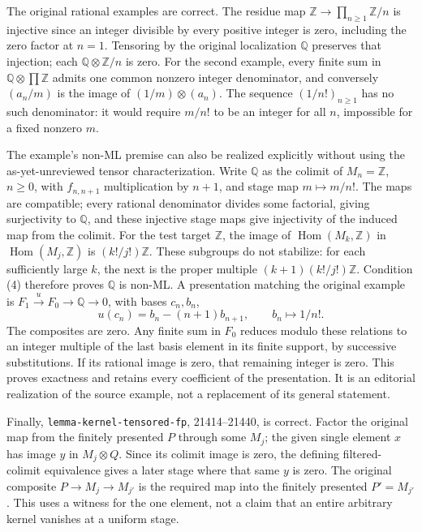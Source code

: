 The original rational examples are correct. The residue map \(\mathbb Z\to\prod_{n\geq1}\mathbb Z/n\) is injective since an integer divisible by every positive integer is zero, including the zero factor at \(n=1\). Tensoring by the original localization \(\mathbb Q\) preserves that injection; each \(\mathbb Q\otimes\mathbb Z/n\) is zero. For the second example, every finite sum in \(\mathbb Q\otimes\prod\mathbb Z\) admits one common nonzero integer denominator, and conversely \((a_n/m)\) is the image of \((1/m)\otimes(a_n)\). The sequence \((1/n!)_{n\geq1}\) has no such denominator: it would require \(m/n!\) to be an integer for all \(n\), impossible for a fixed nonzero \(m\).

The example's non-ML premise can also be realized explicitly without using the as-yet-unreviewed tensor characterization. Write \(\mathbb Q\) as the colimit of \(M_n=\mathbb Z\), \(n\geq0\), with \(f_{n,n+1}\) multiplication by \(n+1\), and stage map \(m\mapsto m/n!\). The maps are compatible; every rational denominator divides some factorial, giving surjectivity to \(\mathbb Q\), and these injective stage maps give injectivity of the induced map from the colimit. For the test target \(\mathbb Z\), the image of \(\operatorname{Hom}(M_k,\mathbb Z)\) in \(\operatorname{Hom}(M_j,\mathbb Z)\) is \((k!/j!)\mathbb Z\). These subgroups do not stabilize: for each sufficiently large \(k\), the next is the proper multiple \((k+1)(k!/j!)\mathbb Z\). Condition (4) therefore proves \(\mathbb Q\) is non-ML. A presentation matching the original example is \(F_1\xrightarrow{u}F_0\to\mathbb Q\to0\), with bases \(c_n,b_n\), \[
u(c_n)=b_n-(n+1)b_{n+1},\qquad b_n\longmapsto1/n!.
\] The composites are zero. Any finite sum in \(F_0\) reduces modulo these relations to an integer multiple of the last basis element in its finite support, by successive substitutions. If its rational image is zero, that remaining integer is zero. This proves exactness and retains every coefficient of the presentation. It is an editorial realization of the source example, not a replacement of its general statement.

Finally, \texttt{lemma-kernel-tensored-fp}, 21414--21440, is correct. Factor the original map from the finitely presented \(P\) through some \(M_j\); the given single element \(x\) has image \(y\) in \(M_j\otimes Q\). Since its colimit image is zero, the defining filtered-colimit equivalence gives a later stage where that same \(y\) is zero. The original composite \(P\to M_j\to M_{j'}\) is the required map into the finitely presented \(P'=M_{j'}\). This uses a witness for the one element, not a claim that an entire arbitrary kernel vanishes at a uniform stage.

